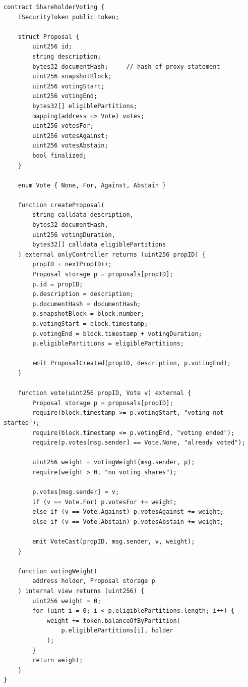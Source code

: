 \documentclass[11pt,a4paper]{article}
\begin{document}
\begin{lstlisting}[language=Solidity,caption={Shareholder voting contract.}]
contract ShareholderVoting {
    ISecurityToken public token;

    struct Proposal {
        uint256 id;
        string description;
        bytes32 documentHash;     // hash of proxy statement
        uint256 snapshotBlock;
        uint256 votingStart;
        uint256 votingEnd;
        bytes32[] eligiblePartitions;
        mapping(address => Vote) votes;
        uint256 votesFor;
        uint256 votesAgainst;
        uint256 votesAbstain;
        bool finalized;
    }

    enum Vote { None, For, Against, Abstain }

    function createProposal(
        string calldata description,
        bytes32 documentHash,
        uint256 votingDuration,
        bytes32[] calldata eligiblePartitions
    ) external onlyController returns (uint256 propID) {
        propID = nextPropID++;
        Proposal storage p = proposals[propID];
        p.id = propID;
        p.description = description;
        p.documentHash = documentHash;
        p.snapshotBlock = block.number;
        p.votingStart = block.timestamp;
        p.votingEnd = block.timestamp + votingDuration;
        p.eligiblePartitions = eligiblePartitions;

        emit ProposalCreated(propID, description, p.votingEnd);
    }

    function vote(uint256 propID, Vote v) external {
        Proposal storage p = proposals[propID];
        require(block.timestamp >= p.votingStart, "voting not started");
        require(block.timestamp <= p.votingEnd, "voting ended");
        require(p.votes[msg.sender] == Vote.None, "already voted");

        uint256 weight = votingWeight(msg.sender, p);
        require(weight > 0, "no voting shares");

        p.votes[msg.sender] = v;
        if (v == Vote.For) p.votesFor += weight;
        else if (v == Vote.Against) p.votesAgainst += weight;
        else if (v == Vote.Abstain) p.votesAbstain += weight;

        emit VoteCast(propID, msg.sender, v, weight);
    }

    function votingWeight(
        address holder, Proposal storage p
    ) internal view returns (uint256) {
        uint256 weight = 0;
        for (uint i = 0; i < p.eligiblePartitions.length; i++) {
            weight += token.balanceOfByPartition(
                p.eligiblePartitions[i], holder
            );
        }
        return weight;
    }
}
\end{lstlisting}
\end{document}
